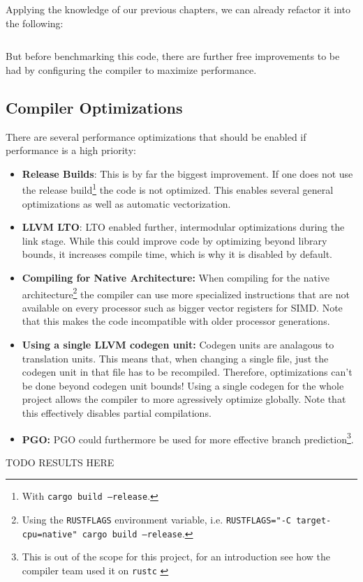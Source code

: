 Applying the knowledge of our previous chapters, we can already refactor it into the following:

\begin{listing}[H]
  \inputminted{rust}{./assets/variadic_optimized.rs}
\caption{The code optimized analagously to chapter 2.}
\end{listing}

But before benchmarking this code, there are further free improvements to be had by configuring the compiler to maximize performance.

\subsection{Compiler Optimizations}
There are several performance optimizations that should be enabled if performance is a high priority:
\begin{itemize}
  \item \textbf{Release Builds}: This is by far the biggest improvement. If one does not use the release build\footnote{With \texttt{cargo build --release}.} the code is not optimized. This enables several general optimizations as well as automatic vectorization.
  \item \textbf{\ac{LLVM} \ac{LTO}}: \ac{LTO} enabled further, intermodular optimizations during the link stage. While this could improve code by optimizing beyond library bounds, it increases compile time, which is why it is disabled by default.
  \item \textbf{Compiling for Native Architecture:} When compiling for the native architecture\footnote{Using the \texttt{RUSTFLAGS} environment variable, i.e. \texttt{RUSTFLAGS="-C target-cpu=native" cargo build --release}.} the compiler can use more specialized instructions that are not available on every processor such as bigger vector registers for SIMD. Note that this makes the code incompatible with older processor generations.
  \item \textbf{Using a single \ac{LLVM} codegen unit:} Codegen units are analagous to translation units. This means that, when changing a single file, just the codegen unit in that file has to be recompiled. Therefore, optimizations can't be done beyond codegen unit bounds! Using a single codegen for the whole project allows the compiler to more agressively optimize globally. Note that this effectively disables partial compilations.
  \item \textbf{\ac{PGO}:} \ac{PGO} could furthermore be used for more effective branch prediction\footnote{This is out of the scope for this project, for an introduction see how the compiler team used it on \texttt{rustc} \cite{pgo}}.
\end{itemize}
TODO RESULTS HERE

